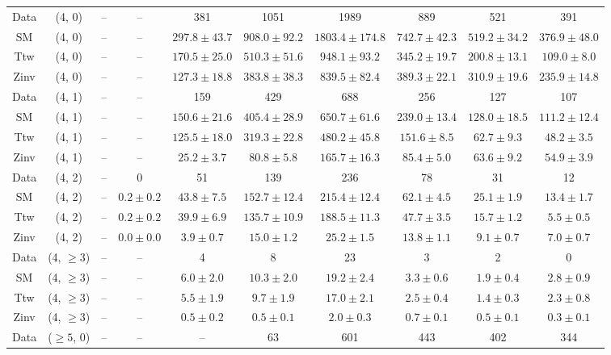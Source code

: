 \begin{table}[h!]
{\begin{tabular}{cccccccccc}
	Data & (4, 0) & -- & -- & 381 & 1051 & 1989 & 889 & 521 & 391 \\[0.5ex] 
	SM & (4, 0) & -- & -- & $297.8\pm 43.7$ & $908.0\pm 92.2$ & $1803.4\pm 174.8$ & $742.7\pm 42.3$ & $519.2\pm 34.2$ & $376.9\pm 48.0$ \\[0.5ex] 
	Ttw & (4, 0) & -- & -- & $170.5\pm 25.0$ & $510.3\pm 51.6$ & $948.1\pm 93.2$ & $345.2\pm 19.7$ & $200.8\pm 13.1$ & $109.0\pm 8.0$ \\[0.5ex] 
	Zinv & (4, 0) & -- & -- & $127.3\pm 18.8$ & $383.8\pm 38.3$ & $839.5\pm 82.4$ & $389.3\pm 22.1$ & $310.9\pm 19.6$ & $235.9\pm 14.8$ \\[0.5ex] 
	Data & (4, 1) & -- & -- & 159 & 429 & 688 & 256 & 127 & 107 \\[0.5ex] 
	SM & (4, 1) & -- & -- & $150.6\pm 21.6$ & $405.4\pm 28.9$ & $650.7\pm 61.6$ & $239.0\pm 13.4$ & $128.0\pm 18.5$ & $111.2\pm 12.4$ \\[0.5ex] 
	Ttw & (4, 1) & -- & -- & $125.5\pm 18.0$ & $319.3\pm 22.8$ & $480.2\pm 45.8$ & $151.6\pm 8.5$ & $62.7\pm 9.3$ & $48.2\pm 3.5$ \\[0.5ex] 
	Zinv & (4, 1) & -- & -- & $25.2\pm 3.7$ & $80.8\pm 5.8$ & $165.7\pm 16.3$ & $85.4\pm 5.0$ & $63.6\pm 9.2$ & $54.9\pm 3.9$ \\[0.5ex] 
	Data & (4, 2) & -- & 0 & 51 & 139 & 236 & 78 & 31 & 12 \\[0.5ex] 
	SM & (4, 2) & -- & $0.2\pm 0.2$ & $43.8\pm 7.5$ & $152.7\pm 12.4$ & $215.4\pm 12.4$ & $62.1\pm 4.5$ & $25.1\pm 1.9$ & $13.4\pm 1.7$ \\[0.5ex] 
	Ttw & (4, 2) & -- & $0.2\pm 0.2$ & $39.9\pm 6.9$ & $135.7\pm 10.9$ & $188.5\pm 11.3$ & $47.7\pm 3.5$ & $15.7\pm 1.2$ & $5.5\pm 0.5$ \\[0.5ex] 
	Zinv & (4, 2) & -- & $0.0\pm 0.0$ & $3.9\pm 0.7$ & $15.0\pm 1.2$ & $25.2\pm 1.5$ & $13.8\pm 1.1$ & $9.1\pm 0.7$ & $7.0\pm 0.7$ \\[0.5ex] 
	Data & (4, $\ge3$) & -- & -- & 4 & 8 & 23 & 3 & 2 & 0 \\[0.5ex] 
	SM & (4, $\ge3$) & -- & -- & $6.0\pm 2.0$ & $10.3\pm 2.0$ & $19.2\pm 2.4$ & $3.3\pm 0.6$ & $1.9\pm 0.4$ & $2.8\pm 0.9$ \\[0.5ex] 
	Ttw & (4, $\ge3$) & -- & -- & $5.5\pm 1.9$ & $9.7\pm 1.9$ & $17.0\pm 2.1$ & $2.5\pm 0.4$ & $1.4\pm 0.3$ & $2.3\pm 0.8$ \\[0.5ex] 
	Zinv & (4, $\ge3$) & -- & -- & $0.5\pm 0.2$ & $0.5\pm 0.1$ & $2.0\pm 0.3$ & $0.7\pm 0.1$ & $0.5\pm 0.1$ & $0.3\pm 0.1$ \\[0.5ex] 
	Data & ($\ge5$, 0) & -- & -- & -- & 63 & 601 & 443 & 402 & 344 \\[0.5ex] 

\end{tabular}}
\end{table}
